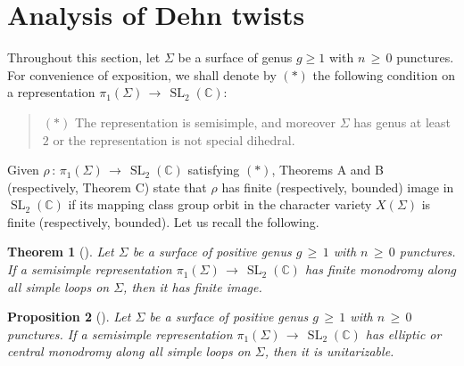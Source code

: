 \documentclass[reqno]{amsart}
\theoremstyle{plain}
\newtheorem{theorem}{Theorem}[section]
\newtheorem{proposition}[theorem]{Proposition}
\theoremstyle{definition}
\theoremstyle{remark}
\newcommand{\C}{{\mathbb{C}}}
\DeclareMathOperator{\SL}{SL}
\begin{document}
\section{Analysis of Dehn twists}\label{sect:4}

Throughout this section, let $\Sigma$ be a surface of genus $g\geq1$ with $n\,\geq\,0$ punctures. For convenience 
of exposition, we shall denote by $(*)$ the following condition on a representation 
$\pi_1(\Sigma)\,\to\,\SL_2(\C)$:

\begin{quotation}
$(*)$ The representation is semisimple, and moreover $\Sigma$ has genus at least $2$ or the representation
is not special dihedral.
\end{quotation}

Given $\rho\,:\,\pi_1(\Sigma)\,\to\,\SL_2(\C)$ satisfying $(*)$, Theorems A and B (respectively, Theorem C) 
state that $\rho$ has finite (respectively, bounded) image in $\SL_2(\C)$ if its mapping class group orbit in 
the character variety $X(\Sigma)$ is finite (respectively, bounded). Let us recall the following.

\begin{theorem}[{\cite[Theorem 1.2]{psw}}]\label{psw}
Let $\Sigma$ be a surface of positive genus $g\,\geq\,1$ with $n\,\geq\,0$ punctures. If a semisimple representation 
$\pi_1(\Sigma)\,\to\,\SL_2(\C)$ has finite monodromy along all simple loops on $\Sigma$, then it has finite image.
\end{theorem}

\begin{proposition}[{\cite[Lemma 2.2]{psw}}]\label{psw2} 
	Let $\Sigma$ be a surface of positive genus $g\,\geq\,1$ with $n\,\geq\,0$ punctures. If a semisimple
representation $\pi_1(\Sigma)\,\to\,\SL_2(\C)$ has elliptic or central monodromy along all simple loops on
$\Sigma$, then it is unitarizable.
\end{proposition}
\end{document}
